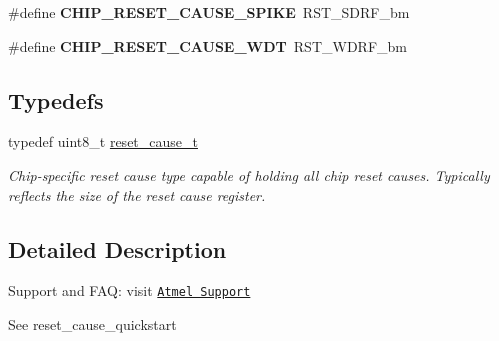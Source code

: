 \begin{DoxyCompactItemize}
\item 
\hypertarget{group__xmega__reset__cause__group_ga097568f1726c4866e55a1289add50e1f}{\#define {\bfseries C\-H\-I\-P\-\_\-\-R\-E\-S\-E\-T\-\_\-\-C\-A\-U\-S\-E\-\_\-\-S\-P\-I\-K\-E}~R\-S\-T\-\_\-\-S\-D\-R\-F\-\_\-bm}\label{group__xmega__reset__cause__group_ga097568f1726c4866e55a1289add50e1f}

\item 
\hypertarget{group__xmega__reset__cause__group_gab97df5ffaace407f3e7ec1aed5eb5591}{\#define {\bfseries C\-H\-I\-P\-\_\-\-R\-E\-S\-E\-T\-\_\-\-C\-A\-U\-S\-E\-\_\-\-W\-D\-T}~R\-S\-T\-\_\-\-W\-D\-R\-F\-\_\-bm}\label{group__xmega__reset__cause__group_gab97df5ffaace407f3e7ec1aed5eb5591}

\end{DoxyCompactItemize}
\subsection*{Typedefs}
\begin{DoxyCompactItemize}
\item 
\hypertarget{group__xmega__reset__cause__group_ga01c9b7fb69210df872feb6e67d9c437e}{typedef uint8\-\_\-t \hyperlink{group__xmega__reset__cause__group_ga01c9b7fb69210df872feb6e67d9c437e}{reset\-\_\-cause\-\_\-t}}\label{group__xmega__reset__cause__group_ga01c9b7fb69210df872feb6e67d9c437e}

\begin{DoxyCompactList}\small\item\em Chip-\/specific reset cause type capable of holding all chip reset causes. Typically reflects the size of the reset cause register. \end{DoxyCompactList}\end{DoxyCompactItemize}


\subsection{Detailed Description}
Support and F\-A\-Q\-: visit \href{http://www.atmel.com/design-support/}{\tt Atmel Support}

See reset\-\_\-cause\-\_\-quickstart 